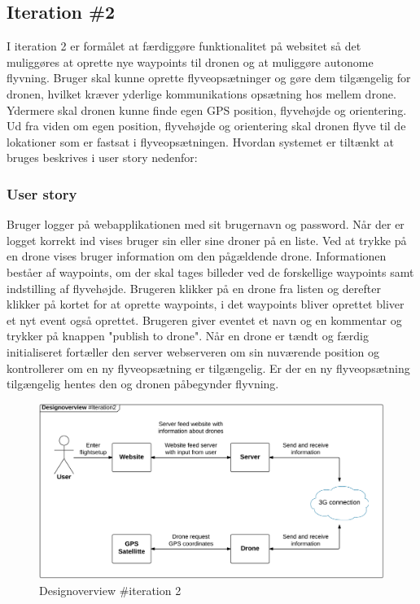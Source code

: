 \subsection{Iteration \#2}
I iteration 2 er formålet at færdiggøre funktionalitet på websitet så det muliggøres at oprette nye waypoints til dronen og at muliggøre autonome flyvning. Bruger skal kunne oprette flyveopsætninger og gøre dem tilgængelig for dronen, hvilket kræver yderlige kommunikations opsætning hos mellem drone. Ydermere skal dronen kunne finde egen GPS position, flyvehøjde og orientering. Ud fra viden om egen position, flyvehøjde og orientering skal dronen flyve til de lokationer som er fastsat i flyveopsætningen. 
Hvordan systemet er tiltænkt at bruges beskrives i user story nedenfor:

\subsubsection*{User story}
Bruger logger på webapplikationen med sit brugernavn og password. Når der er logget korrekt ind vises bruger sin eller sine droner på en liste. Ved at trykke på en drone vises bruger information om den pågældende drone. Informationen beståer af waypoints, om der skal tages billeder ved de forskellige waypoints samt indstilling af flyvehøjde. Brugeren klikker på en drone fra listen og derefter klikker på kortet for at oprette waypoints, i det waypoints bliver oprettet bliver et nyt event også oprettet. Brugeren giver eventet et navn og en kommentar og trykker på knappen "publish to drone".
Når en drone er tændt og færdig initialiseret fortæller den server webserveren om sin nuværende position og kontrollerer om en ny flyveopsætning er tilgængelig. Er der en ny flyveopsætning tilgængelig hentes den og dronen påbegynder flyvning.

\begin{figure}[H]
	\centering
	\includegraphics[width=1\textwidth]{Billeder/design_overview/design_overview_iteration2.png}
	\vspace{-.5cm}
	\caption{Designoverview \#iteration 2}
	\label{fig:design_overview_UC1}
\end{figure}


